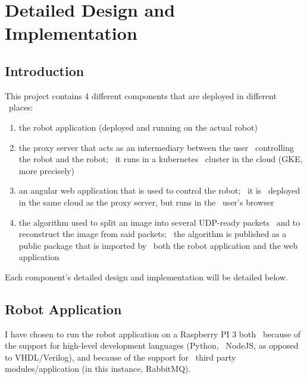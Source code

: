 \chapter{Detailed Design and Implementation}
\label{ch:implementation}



\section{Introduction}
\label{sec:implementation-introduction}
This project contains 4 different components that are deployed in different \
places:
\begin{enumerate}
    \item the robot application (deployed and running on the actual robot)
    \item the proxy server that acts as an intermediary between the user \
            controlling the robot and the robot; \
            it runs in a kubernetes \
            cluster in the cloud (GKE, more precisely)
    \item an angular web application that is used to control the robot; \
            it is \
            deployed in the same cloud as the proxy server, but runs in the \
            user's browser
    \item the algorithm used to split an image into several UDP-ready packets \
            and to reconstruct the image from said packets; \
            the algorithm is published as a public package that is imported by \
            both the robot application and the web application
\end{enumerate}

Each component's detailed design and implementation will be detailed below.

\section{Robot Application}
\label{sec:robot-application}
I have chosen to run the robot application on a Raspberry PI 3 both \
because of the support for high-level development languages (Python, \
NodeJS, as opposed to VHDL/Verilog), and because of the support for \
third party modules/application (in this instance, RabbitMQ).

